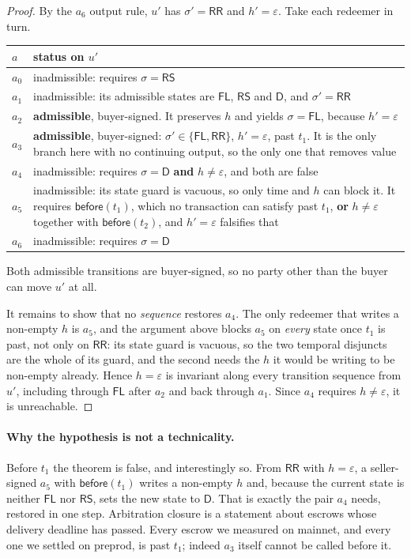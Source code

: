 \documentclass[11pt]{article}
\theoremstyle{remark}
\newcommand{\FL}{\mathsf{FL}}
\newcommand{\RS}{\mathsf{RS}}
\newcommand{\RR}{\mathsf{RR}}
\newcommand{\Dd}{\mathsf{D}}
\newcommand{\before}{\mathsf{before}}
\begin{document}
\begin{proof}
By the $a_6$ output rule, $u'$ has $\sigma' = \RR$ and $h' = \varepsilon$. Take each redeemer in turn.

\begin{center}
\small
\begin{tabular}{@{}lp{11.4cm}@{}}
\toprule
$a$ & status on $u'$ \\
\midrule
$a_0$ & inadmissible: requires $\sigma = \RS$ \\
$a_1$ & inadmissible: its admissible states are $\FL$, $\RS$ and $\Dd$, and $\sigma' = \RR$ \\
$a_2$ & \textbf{admissible}, buyer-signed. It preserves $h$ and yields $\sigma = \FL$, because $h' = \varepsilon$ \\
$a_3$ & \textbf{admissible}, buyer-signed: $\sigma' \in \{\FL,\RR\}$, $h' = \varepsilon$, past $t_1$. It is the only
        branch here with no continuing output, so the only one that removes value \\
$a_4$ & inadmissible: requires $\sigma = \Dd$ \textbf{and} $h \neq \varepsilon$, and both are false \\
$a_5$ & inadmissible: its state guard is vacuous, so only time and $h$ can block it. It requires
        $\before(t_1)$, which no transaction can satisfy past $t_1$, \textbf{or} $h \neq \varepsilon$ together with
        $\before(t_2)$, and $h' = \varepsilon$ falsifies that \\
$a_6$ & inadmissible: requires $\sigma = \Dd$ \\
\bottomrule
\end{tabular}
\end{center}

\noindent Both admissible transitions are buyer-signed, so no party other than the buyer can move $u'$ at all.

It remains to show that no \emph{sequence} restores $a_4$. The only redeemer that writes a non-empty $h$ is $a_5$,
and the argument above blocks $a_5$ on \emph{every} state once $t_1$ is past, not only on $\RR$: its state guard is
vacuous, so the two temporal disjuncts are the whole of its guard, and the second needs the $h$ it would be writing
to be non-empty already. Hence $h = \varepsilon$ is invariant along every transition sequence from $u'$, including
through $\FL$ after $a_2$ and back through $a_1$. Since $a_4$ requires $h \neq \varepsilon$, it is unreachable.
\end{proof}

\paragraph{Why the hypothesis is not a technicality.} Before $t_1$ the theorem is false, and interestingly so. From
$\RR$ with $h = \varepsilon$, a seller-signed $a_5$ with $\before(t_1)$ writes a non-empty $h$ and, because the
current state is neither $\FL$ nor $\RS$, sets the new state to $\Dd$. That is exactly the pair $a_4$ needs, restored
in one step. Arbitration closure is a statement about escrows whose delivery deadline has passed. Every escrow we
measured on mainnet, and every one we settled on preprod, is past $t_1$; indeed $a_3$ itself cannot be called before
it.
\end{document}
